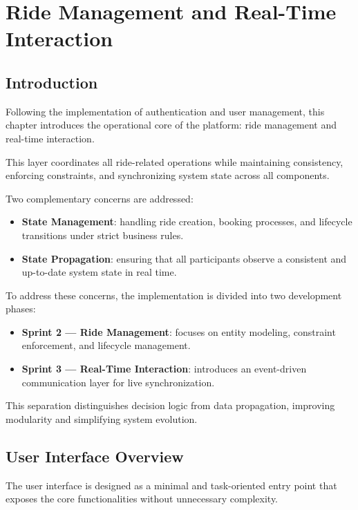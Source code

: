 \chapter{Ride Management and Real-Time Interaction}

\section{Introduction}

Following the implementation of authentication and user management, this chapter introduces the operational core of the platform: ride management and real-time interaction.

This layer coordinates all ride-related operations while maintaining consistency, enforcing constraints, and synchronizing system state across all components.

Two complementary concerns are addressed:

\begin{itemize}
    \item \textbf{State Management}: handling ride creation, booking processes, and lifecycle transitions under strict business rules.
    \item \textbf{State Propagation}: ensuring that all participants observe a consistent and up-to-date system state in real time.
\end{itemize}

To address these concerns, the implementation is divided into two development phases:

\begin{itemize}
    \item \textbf{Sprint 2 — Ride Management}: focuses on entity modeling, constraint enforcement, and lifecycle management.
    \item \textbf{Sprint 3 — Real-Time Interaction}: introduces an event-driven communication layer for live synchronization.
\end{itemize}

This separation distinguishes decision logic from data propagation, improving modularity and simplifying system evolution.

\section{User Interface Overview}

The user interface is designed as a minimal and task-oriented entry point that exposes the core functionalities without unnecessary complexity.

